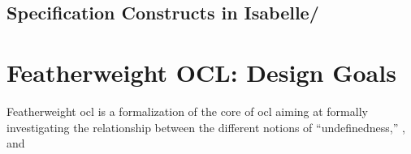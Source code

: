 
\subsection{Specification Constructs in Isabelle/\HOL}\label{sec:spec-constructs}


\section{Featherweight OCL: Design Goals}
Featherweight \acs{ocl} is a formalization of the core of \acs{ocl}
aiming at formally investigating the relationship between the
different notions of ``undefinedness,'' \ie,  and

